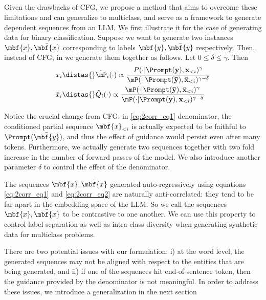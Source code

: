 \subsection{\corrsyn}
Given the drawbacks of CFG, we propose a method that aims to overcome these limitations and can generalize to multiclass, and serve as a framework to generate dependent sequences from an LLM. We first illustrate it for the case of generating data for binary classification. Suppose we want to generate two instances $\mbf{x},\bar{\mbf{x}}$ corresponding to labels $\mbf{y}, \bar{\mbf{y}}$ respectively. Then, instead of CFG, in \corrsyn we generate them together as follows. Let $0\leq \delta\leq \gamma$. Then
\begin{align}
    & x_i \distas{}  \tilde \mP_i(\cdot) \propto \frac{P(\cdot|\Prompt(\mathbf{y}),\mathbf{x}_{<i})^\gamma}{\mP(\cdot|\Prompt(\mathbf{\bar{\mathbf{y}}}),\bar{\mathbf{x}}_{<i})^{\gamma-\delta}} \label{eq:2corr_eq1}\\
   & \bar{x}_i  \distas{} \tilde Q_i(\cdot) \propto \frac{\mP(\cdot|\Prompt(\mathbf{\bar{\mathbf{y}}}),\bar{\mathbf{x}}_{<i})^\gamma}{\mP(\cdot|\Prompt(\mathbf{y}),\mathbf{x}_{<i})^{\gamma-\delta}} \label{eq:2corr_eq2}
\end{align}

 Notice the crucial change from CFG: in \eqref{eq:2corr_eq1} denominator, the conditioned partial sequence $\bar{\mbf{x}}_{<i}$ is actually expected to be faithful to $\Prompt(\bar{\mbf{y}})$, and thus the effect of guidance would persist even after many tokens. Furthermore, we actually generate two sequences together with two fold increase in the number of forward passes of the model. We also introduce another parameter $\delta$ to control the effect of the denominator. 

The sequences $\mbf{x}, \bar{\mbf{x}}$ generated auto-regressively using equations \eqref{eq:2corr_eq1} and \eqref{eq:2corr_eq2} are naturally anti-correlated: they tend to be far apart in the embedding space of the LLM. So we call the sequences $\mbf{x},\bar{\mbf{x}}$ to be contrastive to one another. We can use this property to control label separation as well as intra-class diversity when generating synthetic data for multiclass problems. 

There are two potential issues with our formulation: i) at the word level, the generated sequences may not be aligned with respect to the entities that are being generated, and ii) if one of the sequences hit end-of-sentence token, then the guidance provided by the denominator is not meaningful. In order to address these issues, we introduce a generalization in the next section

